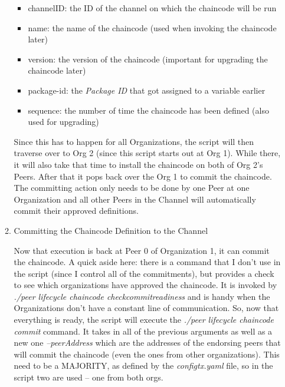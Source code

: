 \begin{itemize}
\begin{enumerate}
								\begin{itemize}
									\item channelID: the ID of the channel on which the chaincode will be run
									\item name: the name of the chaincode (used when invoking the chaincode later)
									\item version: the version of the chaincode (important for upgrading the chaincode later)
									\item package-id: the \textit{Package ID} that got assigned to a variable earlier
									\item sequence: the number of time the chaincode has been defined (also used for upgrading)
								\end{itemize}
								
							\hspace{10mm}Since this has to happen for all Organizations, the script will then traverse over to Org 2 (since this script starts out at Org 1). While there, it will also take that time to install the chaincode on both of Org 2's Peers. After that it pops back over the Org 1 to commit the chaincode. The committing action only needs to be done by one Peer at one Organization and all other Peers in the Channel will automatically commit their approved definitions.
							 
							\item Committing the Chaincode Definition to the Channel
							
								\hspace{10mm}Now that execution is back at Peer 0 of Organization 1, it can commit the chaincode. A quick aside here: there is a command that I don't use in the script (since I control all of the commitments), but provides a check to see which organizations have approved the chaincode. It is invoked by \textit{./peer lifecycle chaincode checkcommitreadiness} and is handy when the Organizations don't have a constant line of communication. So, now that everything is ready, the script will execute the \textit{./peer lifecycle chaincode commit} command. It takes in all of the previous arguments as well as a new one \textit{--peerAddress} which are the addresses of the endorsing peers that will commit the chaincode (even the ones from other organizations). This need to be a MAJORITY, as defined by the \textit{configtx.yaml} file, so in the script two are used -- one from both orgs. 
								
						\end{enumerate}				
			\end{itemize}

